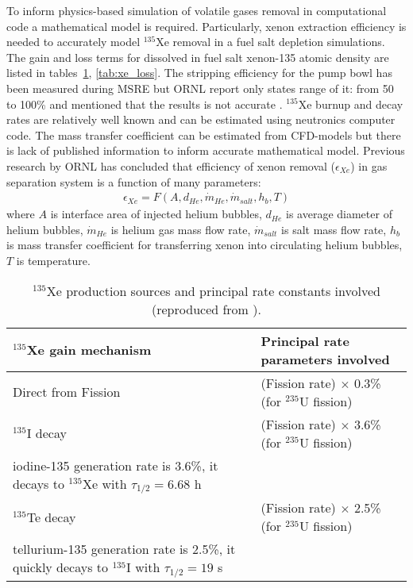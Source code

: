To inform physics-based simulation of volatile gases removal in  
computational code a mathematical model is required. Particularly, xenon 
extraction efficiency is needed to accurately model $^{135}$Xe removal in 
a fuel salt 
depletion simulations. The gain and loss terms for dissolved in fuel salt 
xenon-135 atomic density are listed in tables~\ref{tab:xe_gain}, \ref{tab:xe_loss}. The stripping 
efficiency for the pump bowl has been measured during \gls{MSRE} but \gls{ORNL} report only states range of it: from 50 to 100\% and mentioned that the results is not accurate \cite{kedl_development_1967}. $^{135}$Xe burnup and 
decay rates are relatively well known and can be estimated using neutronics 
computer code. The mass transfer coefficient can be estimated from CFD-models but 
there is lack of published information to inform accurate mathematical model. Previous 
research by \gls{ORNL} \cite{kedl_development_1967, engel_xenon_1971} has concluded that efficiency of xenon removal ($\epsilon_{Xe}$) in gas separation system is 
a function of many parameters:
\begin{align}
\epsilon_{Xe} = F (A, d_{He}, \dot{m}_{He}, \dot{m}_{salt}, h_b, T)
\end{align}
where $A$ is interface area of injected helium bubbles, $d_{He}$ is average diameter 
of helium bubbles, $\dot{m}_{He}$ is helium gas mass flow rate, $\dot{m}_{salt}$ is 
salt mass flow rate, $h_b$ is mass transfer coefficient for transferring xenon into 
circulating helium bubbles, $T$ is temperature. 
\begin{table}[ht!]
\caption{$^{135}$Xe production sources and principal rate constants involved
 (reproduced from \cite{kedl_development_1967}).}
  \centering
\begin{tabularx}{\textwidth}{b | b}
\hline \textbf{$^{135}$Xe gain mechanism}      & \textbf{Principal rate 
parameters involved}  	\\
\hline Direct from Fission   & (Fission rate) $\times$ 0.3\% (for $^{235}$U fission) \\
\hline $^{135}$I decay       & (Fission rate) $\times$ 3.6\% (for $^{235}$U fission) \\
iodine-135 generation rate is 3.6\%, 
it decays to $^{135}$Xe with $\tau_{1/2}=6.68$ h & 			                    \\		\hline $^{135}$Te decay      & (Fission rate) $\times$ 2.5\% (for $^{235}$U fission) \\
tellurium-135 generation rate is 2.5\%, 
it quickly decays to $^{135}$I with $\tau_{1/2}=19$ s & 			                    \\					
\hline 
\end{tabularx}
  		\label{tab:xe_gain}
\end{table}
